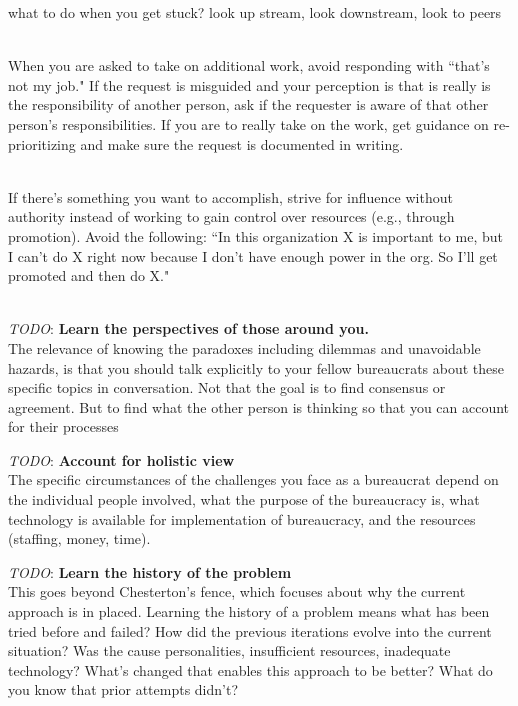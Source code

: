 what to do when you get stuck?
look up stream, look downstream, look to peers

\ \\

When you are asked to take on additional work, avoid responding with ``that's not my job." If the request is misguided and your perception is that is really is the responsibility of another person, ask if the requester is aware of that other person's responsibilities. If you are to really take on the work, get guidance on re-prioritizing and make sure the request is documented in writing. 

\ \\

If there's something you want to accomplish, strive for influence without authority instead of working to gain control over resources (e.g., through promotion). Avoid the following: ``In this organization X is important to me, but I can't do X right now because I don't have enough power in the org. So I'll get promoted and then do X."

\ \\



\textit{TODO}: \textbf{Learn the perspectives of those around you.}\\
The relevance of knowing the paradoxes including dilemmas and unavoidable hazards, is that you should talk explicitly to your fellow bureaucrats about these specific topics in conversation. Not that the goal is to find consensus or agreement. But to find what the other person is thinking so that you can account for their processes


\textit{TODO}: \textbf{Account for holistic view}\\
The specific circumstances of the challenges you face as a bureaucrat depend on the individual people involved, what the purpose of the bureaucracy is, what technology is available for implementation of bureaucracy, and the resources (staffing, money, time). 

\textit{TODO}: \textbf{Learn the history of the problem}\\
This goes beyond Chesterton's fence, which focuses about why the current approach is in placed. Learning the history of a problem means what has been tried before and failed? How did the previous iterations evolve into the current situation? Was the cause personalities, insufficient resources, inadequate technology? What's changed that enables this approach to be better? What do you know that prior attempts didn't?

